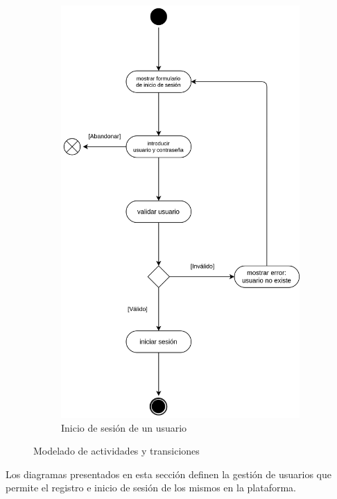 \begin{figure}[h]
\begin{subfigure}{0.45\textwidth}
                    \centering
                    \includegraphics[scale=0.15]{images/Diagramas/Actividades y transiciones 2.png}
                    \caption{Inicio de sesión de un usuario}
                    \label{fig:inicio-usuario}
                \end{subfigure}
                \caption{Modelado de actividades y transiciones}
                \label{fig:actividades-transiciones}
            \end{figure}
            
            Los diagramas presentados en esta sección definen la gestión de usuarios que permite el registro e inicio de sesión de los mismos en la plataforma.
            
